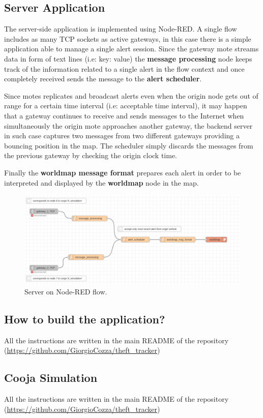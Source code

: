 \documentclass[]{article}
\begin{document}
\subsection{Server Application}
The server-side application is implemented using Node-RED. A single flow includes as many TCP sockets as active gateways, in this case there is a simple application able to manage a single alert session. Since the gateway mote streams data in form of text lines (i.e: key: value) the \textbf{message processing} node keeps track of the information related to a single alert in the flow context and once completely received sends the message to the \textbf{alert scheduler}.\par Since motes replicates and broadcast alerts even when the origin node gets out of range for a certain time interval (i.e: acceptable time interval), it may happen that a gateway continues to receive and sends messages to the Internet when simultaneously the origin mote approaches another gateway, the backend server in such case captures two messages from two different gateways providing a bouncing position in the map. The scheduler simply discards the messages from the previous gateway by checking the origin clock time.\par
Finally the \textbf{worldmap message format} prepares each alert in order to be interpreted and displayed by the \textbf{worldmap} node in the map.

\begin{figure}[h!]
	\includegraphics[scale=0.3]{./images/tt_server_arc.png}
	\caption{Server on Node-RED flow.}\label{tt-fig:2}
\end{figure}

\subsection{How to build the application?}
All the instructions are written in the main README of the repository 
 (\url{https://github.com/GiorgioCozza/theft_tracker}) 
\subsection{Cooja Simulation}
All the instructions are written in the main README of the repository 
(\url{https://github.com/GiorgioCozza/theft_tracker})
\end{document}
